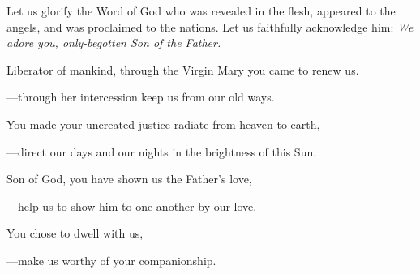 \intercessions\indent

\begin{hangpar}

Let us glorify the Word of God who was revealed in the flesh, appeared to the angels, and was proclaimed to the nations. Let us faithfully acknowledge him:
\emph{We adore you, only-begotten Son of the Father.}

\medskip Liberator of mankind, through the Virgin Mary you came to renew us.

{\color{red}---\thinspace}through her intercession keep us from our old ways.

\medskip You made your uncreated justice radiate from heaven to earth,

{\color{red}---\thinspace}direct our days and our nights in the brightness of this Sun.

\medskip Son of God, you have shown us the Father's love,

{\color{red}---\thinspace}help us to show him to one another by our love.

\medskip You chose to dwell with us,

{\color{red}---\thinspace}make us worthy of your companionship.

\medskip

\end{hangpar}
